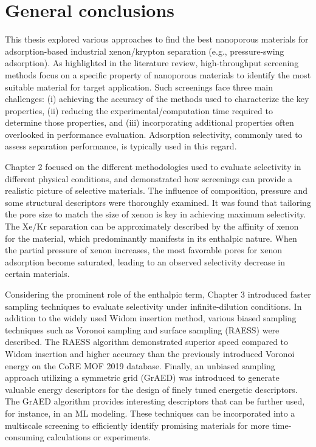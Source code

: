 
\chapter*{General conclusions}

This thesis explored various approaches to find the best nanoporous materials for adsorption-based industrial xenon/krypton separation (e.g., pressure-swing adsorption). As highlighted in the literature review,\autocite{Ren_2022} high-throughput screening methods focus on a specific property of nanoporous materials to identify the most suitable material for target application. Such screenings face three main challenges: (i) achieving the accuracy of the methods used to characterize the key properties, (ii) reducing the experimental/computation time required to determine those properties, and (iii) incorporating additional properties often overlooked in performance evaluation. Adsorption selectivity, commonly used to assess separation performance, is typically used in this regard.

Chapter 2 focused on the different methodologies used to evaluate selectivity in different physical conditions, and demonstrated how screenings can provide a realistic picture of selective materials.\autocite{Ren_2021} The influence of composition, pressure and some structural descriptors were thoroughly examined. It was found that tailoring the pore size to match the size of xenon is key in achieving maximum selectivity. The Xe/Kr separation can be approximately described by the affinity of xenon for the material, which predominantly manifests in its enthalpic nature. When the partial pressure of xenon increases, the most favorable pores for xenon adsorption become saturated, leading to an observed selectivity decrease in certain materials.
 
Considering the prominent role of the enthalpic term, Chapter 3 introduced faster sampling techniques to evaluate selectivity under infinite-dilution conditions. In addition to the widely used Widom insertion method, various biased sampling techniques such as Voronoi sampling and surface sampling (RAESS) were described. The RAESS algorithm\autocite{Ren_2023} demonstrated superior speed compared to Widom insertion and higher accuracy than the previously introduced Voronoi energy\autocite{Simon_2015} on the CoRE MOF 2019 database. Finally, an unbiased sampling approach utilizing a symmetric grid (GrAED) was introduced to generate valuable energy descriptors for the design of finely tuned energetic descriptors. The GrAED algorithm provides interesting descriptors that can be further used, for instance, in an ML modeling. These techniques can be incorporated into a multiscale screening to efficiently identify promising materials for more time-consuming calculations or experiments.

